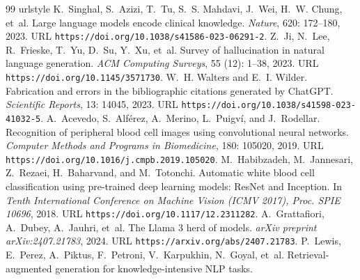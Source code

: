 {\begin{thebibliography}{99}
\providecommand{\natexlab}[1]{#1}
\providecommand{\url}[1]{\texttt{#1}}
\expandafter\ifx\csname urlstyle\endcsname\relax
  \providecommand{\doi}[1]{doi: #1}\else
  \providecommand{\doi}{doi: \begingroup \urlstyle{rm}\Url}\fi
\setcounter{enumiv}{0}\setcounter{NAT@ctr}{0}
K.~Singhal, S.~Azizi, T.~Tu, S.~S. Mahdavi, J.~Wei, H.~W. Chung, et~al.
\newblock Large language models encode clinical knowledge.
\newblock \emph{Nature}, 620: 172--180, 2023.
\newblock URL \url{https://doi.org/10.1038/s41586-023-06291-2}.
Z.~Ji, N.~Lee, R.~Frieske, T.~Yu, D.~Su, Y.~Xu, et~al.
\newblock Survey of hallucination in natural language generation.
\newblock \emph{ACM Computing Surveys}, 55 (12): 1--38, 2023.
\newblock URL \url{https://doi.org/10.1145/3571730}.
W.~H. Walters and E.~I. Wilder.
\newblock Fabrication and errors in the bibliographic citations generated by
  {ChatGPT}.
\newblock \emph{Scientific Reports}, 13: 14045, 2023.
\newblock URL \url{https://doi.org/10.1038/s41598-023-41032-5}.
A.~Acevedo, S.~Alf{\'e}rez, A.~Merino, L.~Puigv{\'i}, and J.~Rodellar.
\newblock Recognition of peripheral blood cell images using convolutional
  neural networks.
\newblock \emph{Computer Methods and Programs in Biomedicine}, 180:
  105020, 2019.
\newblock URL \url{https://doi.org/10.1016/j.cmpb.2019.105020}.
M.~Habibzadeh, M.~Jannesari, Z.~Rezaei, H.~Baharvand, and M.~Totonchi.
\newblock Automatic white blood cell classification using pre-trained deep
  learning models: {ResNet} and {Inception}.
\newblock In \emph{Tenth International Conference on Machine Vision (ICMV
  2017), Proc. SPIE 10696}, 2018.
\newblock URL \url{https://doi.org/10.1117/12.2311282}.
A.~Grattafiori, A.~Dubey, A.~Jauhri, et~al.
\newblock The {Llama} 3 herd of models.
\newblock \emph{arXiv preprint arXiv:2407.21783}, 2024.
\newblock URL \url{https://arxiv.org/abs/2407.21783}.
P.~Lewis, E.~Perez, A.~Piktus, F.~Petroni, V.~Karpukhin, N.~Goyal, et~al.
\newblock Retrieval-augmented generation for knowledge-intensive {NLP} tasks.

\end{thebibliography}}
